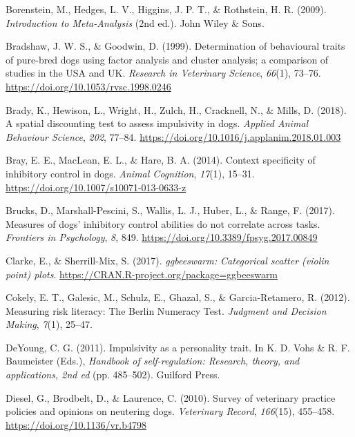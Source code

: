 \documentclass[
  pub,floatsintext]{apa6}
\newlength{\cslhangindent}
\newlength{\cslentryspacingunit} %
\newenvironment{CSLReferences}[2] %
 {%
  \setlength{\parindent}{0pt}
  \ifodd #1
  \let\oldpar\par
  \def\par{\hangindent=\cslhangindent\oldpar}
  \fi
  \setlength{\parskip}{#2\cslentryspacingunit}
 }%
 {}
\begin{document}
\begin{CSLReferences}{1}{0}
\leavevmode{}%
Borenstein, M., Hedges, L. V., Higgins, J. P. T., \& Rothstein, H. R. (2009). \emph{Introduction to {Meta-Analysis}} (2nd ed.). {John Wiley \& Sons}.

\leavevmode{}%
Bradshaw, J. W. S., \& Goodwin, D. (1999). Determination of behavioural traits of pure-bred dogs using factor analysis and cluster analysis; a comparison of studies in the {USA} and {UK}. \emph{Research in Veterinary Science}, \emph{66}(1), 73--76. \url{https://doi.org/10.1053/rvsc.1998.0246}

\leavevmode{}%
Brady, K., Hewison, L., Wright, H., Zulch, H., Cracknell, N., \& Mills, D. (2018). A spatial discounting test to assess impulsivity in dogs. \emph{Applied Animal Behaviour Science}, \emph{202}, 77--84. \url{https://doi.org/10.1016/j.applanim.2018.01.003}

\leavevmode{}%
Bray, E. E., MacLean, E. L., \& Hare, B. A. (2014). Context specificity of inhibitory control in dogs. \emph{Animal Cognition}, \emph{17}(1), 15--31. \url{https://doi.org/10.1007/s10071-013-0633-z}

\leavevmode{}%
Brucks, D., Marshall-Pescini, S., Wallis, L. J., Huber, L., \& Range, F. (2017). Measures of dogs' inhibitory control abilities do not correlate across tasks. \emph{Frontiers in Psychology}, \emph{8}, 849. \url{https://doi.org/10.3389/fpsyg.2017.00849}

\leavevmode{}%
Clarke, E., \& Sherrill-Mix, S. (2017). \emph{{ggbeeswarm}: Categorical scatter (violin point) plots}. \url{https://CRAN.R-project.org/package=ggbeeswarm}

\leavevmode{}%
Cokely, E. T., Galesic, M., Schulz, E., Ghazal, S., \& Garcia-Retamero, R. (2012). Measuring risk literacy: {The Berlin Numeracy Test}. \emph{Judgment and Decision Making}, \emph{7}(1), 25--47.

\leavevmode{}%
DeYoung, C. G. (2011). Impulsivity as a personality trait. In K. D. Vohs \& R. F. Baumeister (Eds.), \emph{Handbook of self-regulation: {Research}, theory, and applications, 2nd ed} (pp. 485--502). {Guilford Press}.

\leavevmode{}%
Diesel, G., Brodbelt, D., \& Laurence, C. (2010). Survey of veterinary practice policies and opinions on neutering dogs. \emph{Veterinary Record}, \emph{166}(15), 455--458. \url{https://doi.org/10.1136/vr.b4798}


\end{CSLReferences}
\end{document}
